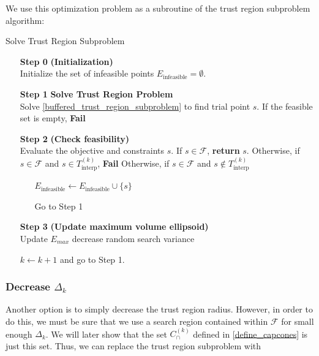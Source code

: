 \documentclass{article}
\theoremstyle{case}
\numberwithin{theorem}{subsection}
\newcommand{\capcones}{{C^{(k)}_{\cap}}}
\newcommand{\dk}{\Delta_k}
\newcommand{\feasible}{{\mathcal F}}
\newcommand{\sampletrk}{{T_{\text{interp}}^{(k)}}}
\newcommand{\trsinfset}{{E_\textrm{infeasible}}}
\begin{document}
We use this optimization problem as a subroutine of the trust region subproblem algorithm:

\begin{algorithm}[H]
    \caption{Solve Trust Region Subproblem}
    \label{linear_cut_trust_region_subproblem}
    \begin{itemize}
        \item[\textbf{Step 0}] \textbf{(Initialization)} \\
	    Initialize the set of infeasible points $\trsinfset = \emptyset$.
        
        \item[\textbf{Step 1}] \textbf{Solve Trust Region Problem} \\
	    Solve \cref{buffered_trust_region_subproblem} to find trial point $s$.
	    If the feasible set is empty, \textbf{Fail}
        
        \item[\textbf{Step 2}] \textbf{(Check feasibility)} \\
            Evaluate the objective and constraints $s$.
            If $s\in\feasible$, \textbf{return} $s$.
            Otherwise, if $s\in\feasible$ and $s \in \sampletrk$, \textbf{Fail}
	    Otherwise, if $s\in\feasible$ and $s \not \in \sampletrk$ \begin{itemize}
	    	\item[] $\trsinfset \gets \trsinfset \cup \{s\}$
	    	\item[] Go to Step 1
	    \end{itemize}
            
        \item[\textbf{Step 3}] \textbf{(Update maximum volume ellipsoid)} \\
	    Update $E_{max}$
	    decrease random search variance
            
        $k \gets k+1$ and go to Step 1.
    \end{itemize}
\end{algorithm}




\subsubsection{Decrease $\dk$}

Another option is to simply decrease the trust region radius.
However, in order to do this, we must be sure that we use a search region contained within $\feasible$ for small enough $\dk$.
We will later show that the set $\capcones$ defined in \cref{define_capcones} is just this set.
Thus, we can replace the trust region subproblem with
\end{document}
